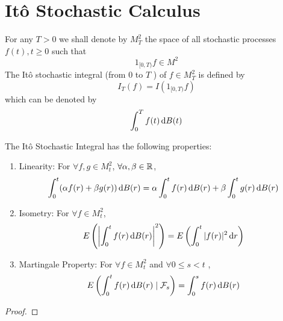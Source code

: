 \section{It\^o Stochastic Calculus}

\begin{definition}
	For any $T>0$ we shall denote by $M_{T}^{2}$ the space of all stochastic processes $f(t), t \geq 0$ such that
	\begin{equation*}
		1_{[0,T)}f\in M^{2}
	\end{equation*}
	The It\^o stochastic integral (from $0$ to $T$ ) of $f\in M_{T}^{2}$ is defined by
	\begin{equation}
		I_{T}(f)=I\left(1_{[0,T)}f\right)
	\end{equation}
	which can be denoted by
	\begin{equation}
		\int_{0}^{T}f(t)\mathop{}\!\mathrm{d} B(t)
	\end{equation}
\end{definition}

\begin{property}
	The It\^o Stochastic Integral has the following properties:
	\begin{enumerate}
		\item Linearity: For $\forall f,g\in M_{t}^{2}$, $\forall \alpha,\beta\in{\mathbb R}$,
		      \begin{equation}
			      \int_{0}^{t}(\alpha f(r)+\beta g(r))\mathop{}\!\mathrm{d} B(r)=\alpha \int_{0}^{t}f(r)\mathop{}\!\mathrm{d} B(r)+\beta\int_{0}^{t}g(r)\mathop{}\!\mathrm{d} B(r)
		      \end{equation}
		\item Isometry: For $\forall f\in M_{t}^{2}$,
		      \begin{equation}
			      E\left(\left|\int_{0}^{t}f(r)\mathop{}\!\mathrm{d} B(r)\right|^{2}\right)=E\left(\int_{0}^{t}|f(r)|^{2}\mathop{}\!\mathrm{d} r\right)
		      \end{equation}
		\item Martingale Property: For $\forall f\in M_{t}^{2}$ and  $\forall 0\leq s<t$ ,
		      \begin{equation}
			      E\left(\int_{0}^{t}f(r)\mathop{}\!\mathrm{d} B(r)\mid\mathcal{F}_{s}\right)=\int_{0}^{s}f(r)\mathop{}\!\mathrm{d} B(r)
		      \end{equation}
	\end{enumerate}
\end{property}

\begin{proof}

\end{proof}

